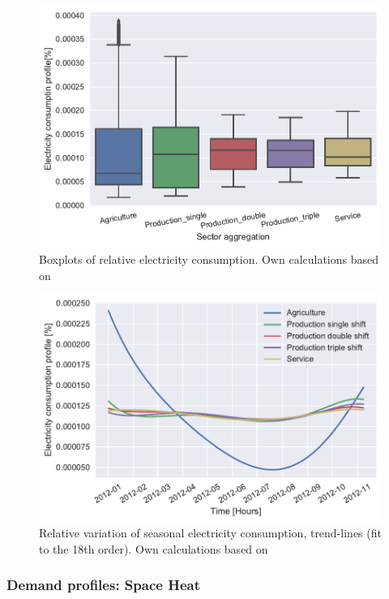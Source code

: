 \documentclass[review]{elsarticle}
\begin{document}
\begin{figure}[H]
\centering
\includegraphics[width=\linewidth]{Img/profiles/boxplots.pdf}
\caption{Boxplots of relative electricity consumption. Own calculations based on \cite{Energinet.dk,NordPool2016,ElforbrugsPanelerne2015,Andersen2013a,Andersen2013b,VM2015}}
\label{boxplots} 
\end{figure}

\begin{figure}[H]
\centering
\includegraphics[width=\linewidth]{Img/profiles/trendlines.pdf}
\caption{Relative variation of seasonal electricity consumption, trend-lines (fit to the 18th order). Own calculations based on \cite{Energinet.dk,NordPool2016,ElforbrugsPanelerne2015,Andersen2013a,Andersen2013b,VM2015}}
\label{trendlines}
\end{figure}

\subsubsection{Demand profiles: Space Heat}
\end{document}
